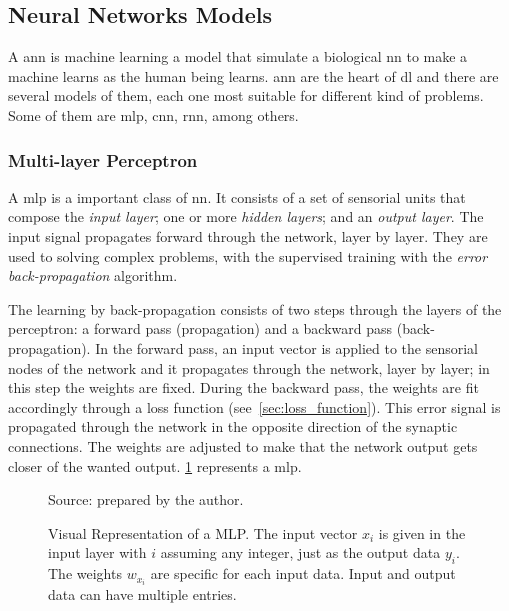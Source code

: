 \subsection{Neural Networks Models}\label{sec:nn_models}

A \gls*{ann} is machine learning a model that simulate a biological \gls*{nn} to make a machine learns as the human being learns.
\gls*{ann} are the heart of \gls*{dl} and there are several models of them, each one most suitable for different kind of problems.
Some of them are \gls*{mlp}, \gls*{cnn}, \gls*{rnn}, among others.

\subsubsection*{Multi-layer Perceptron}

A \gls*{mlp} is a important class of \gls*{nn}. It consists of a set of sensorial units that compose the \emph{input layer}; one or more \emph{hidden layers}; and an \emph{output layer}. 
The input signal propagates forward through the network, layer by layer. 
They are used to solving complex problems, with the supervised training with the \emph{error back-propagation} algorithm.

The learning by back-propagation consists of two steps through the layers of the perceptron: a forward pass (propagation) and a backward pass (back-propagation). 
In the forward pass, an input vector is applied to the sensorial nodes of the network and it propagates through the network, layer by layer; in this step the weights are fixed. 
During the backward pass, the weights are fit accordingly through a loss function (see~\cref{sec:loss_function}). 
This error signal is propagated through the network in the opposite direction of the synaptic connections. 
The weights are adjusted to make that the network output gets closer of the wanted output. 
\cref{fig:mlp} represents a \gls*{mlp}.

\begin{figure}[!htb]
    \centering
    \caption[Visual Representation of a MLP]{Visual Representation of a MLP. The input vector \(x_i\) is given in the input layer with \(i\) assuming any integer, just as the output data \(y_i\). The weights \(w_{x_i}\) are specific for each input data. Input and output data can have multiple entries.}
    
    
    {\footnotesize Source: prepared by the author.}
    \label{fig:mlp}
\end{figure}

